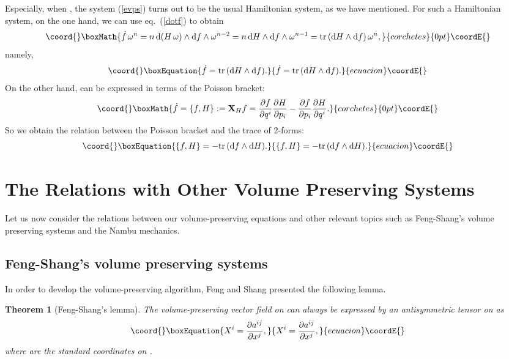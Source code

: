 \documentclass[12pt,a4paper]{article}
\providecommand{\dd}{\mathrm{d}}
\providecommand{\vect}{\mathbf}
\providecommand{\tr}{\mathrm{tr\,}}
\newtheorem{thm}{Theorem}
\begin{document}
Especially, when \coordHE{}, the system
(\ref{evps})
turns out to be the usual Hamiltonian system, as we have
mentioned. For such
a Hamiltonian system, on the one hand, we can use eq.~(\ref{dotf})
to obtain
\begin{displaymath}\coord{}\boxMath{
  \dot{f}\,\omega^n
  = n\,\dd(H\,\omega)\wedge\dd f\wedge\omega^{n-2}
  = n\,\dd H\wedge\dd f\wedge\omega^{n-1}
  = \tr(\dd H\wedge\dd f)\,\omega^n,
}{corchetes}{0pt}\coordE{}\end{displaymath}
namely,
\begin{equation}\coord{}\boxEquation{
  \dot{f} = \tr(\dd H\wedge\dd f).
}{
  \dot{f} = \tr(\dd H\wedge\dd f).
}{ecuacion}\coordE{}\end{equation}
On the other hand, \coordHE{} can be expressed in terms of the
Poisson bracket:
\begin{displaymath}\coord{}\boxMath{
  \dot{f} = \{f,H\} := \vect{X}_H f
  = \frac{\partial f}{\partial q^i}\frac{\partial H}{\partial
  p_i}
  - \frac{\partial f}{\partial p_i}\frac{\partial H}{\partial q^i}.
}{corchetes}{0pt}\coordE{}\end{displaymath}
So we obtain the relation between the Poisson bracket and the
trace of 2-forms:
\begin{equation}\coord{}\boxEquation{
  \{f,H\} = - \tr(\dd f\wedge\dd H).
}{
  \{f,H\} = - \tr(\dd f\wedge\dd H).
}{ecuacion}\coordE{}\end{equation}





\section{The Relations with Other
Volume Preserving Systems}

Let us now consider the relations between our volume-preserving
equations and other relevant topics such as Feng-Shang's volume
preserving systems and the Nambu mechanics.

\subsection{Feng-Shang's volume preserving systems}

In order to develop the volume-preserving algorithm, Feng and
Shang \cite{FS} presented the following lemma.

\begin{thm}[Feng-Shang's lemma]
The volume-preserving vector field
   \coordHE{}
on \coordHE{} can always be expressed by an antisymmetric
tensor \coordHE{} on \coordHE{} as
\begin{equation}\coord{}\boxEquation{
  X^i = \frac{\partial a^{ij}}{\partial x^j},
\label{divfree}
}{
  X^i = \frac{\partial a^{ij}}{\partial x^j},
}{ecuacion}\coordE{}\end{equation}
where \coordHE{} are the standard coordinates on \coordHE{}.
\end{thm}
\end{document}
